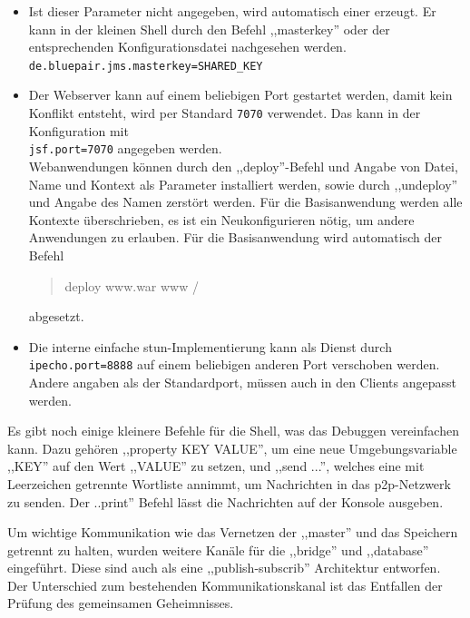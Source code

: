 \documentclass[oneside, ngerman, toc=bibliography,bibliography=totoc,listof=entryprefix, open=right,numbers=noenddot,fontsize=12pt]{scrbook}
\begin{document}
\begin{itemize}
    
    \item 
    Ist dieser Parameter nicht angegeben, wird automatisch einer erzeugt. Er kann in der kleinen Shell durch den Befehl ,,masterkey'' oder der entsprechenden Konfigurationsdatei nachgesehen werden.\\
    \verb|de.bluepair.jms.masterkey=SHARED_KEY|
    \item Der Webserver kann auf einem beliebigen Port gestartet werden, damit kein Konflikt entsteht, wird per Standard \verb|7070| verwendet. Das kann in der Konfiguration mit \\
    \verb|jsf.port=7070| angegeben werden. \\
    Webanwendungen können durch den ,,deploy''-Befehl und Angabe von Datei, Name und Kontext als Parameter installiert werden, sowie durch ,,undeploy'' und Angabe des Namen zerstört werden.
    Für die Basisanwendung werden alle Kontexte überschrieben, es ist ein Neukonfigurieren nötig, um andere Anwendungen zu erlauben. Für die Basisanwendung wird automatisch der Befehl\\
    \begin{quote}
        deploy www.war www /
    \end{quote}
     abgesetzt.
     
     
     
     \item Die interne einfache \acrshort{stun}-Implementierung kann als Dienst durch \\
     \verb|ipecho.port=8888| auf einem beliebigen anderen Port verschoben werden. Andere angaben als der Standardport, müssen auch in den Clients angepasst werden.
     
     
    
\end{itemize}


Es gibt noch einige kleinere Befehle für die Shell, was das Debuggen vereinfachen kann. Dazu gehören ,,property KEY VALUE'', um eine neue Umgebungsvariable ,,KEY'' auf den Wert ,,VALUE'' zu setzen, und ,,send ...'', welches eine mit Leerzeichen getrennte Wortliste annimmt, um Nachrichten in das \acrshort{p2p}-Netzwerk zu senden. Der ..print'' Befehl lässt die Nachrichten auf der Konsole ausgeben.

Um wichtige Kommunikation wie das Vernetzen der ,,master'' und das Speichern getrennt zu halten, wurden weitere Kanäle  für die ,,bridge'' und ,,database'' eingeführt. Diese sind auch als eine ,,publish-subscrib'' Architektur entworfen. Der Unterschied zum bestehenden Kommunikationskanal ist das Entfallen der Prüfung des gemeinsamen Geheimnisses.
\end{document}
